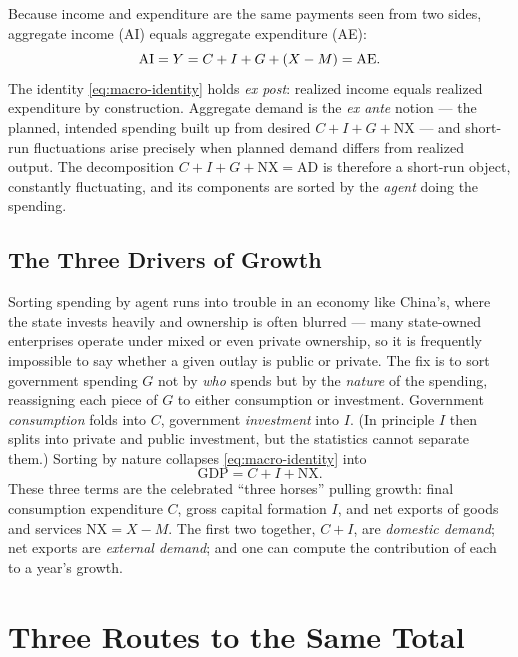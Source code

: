 Because income and expenditure are the same payments seen from two sides, aggregate income (AI) equals aggregate expenditure (AE):
\begin{equation}
\mathrm{AI} = Y = C + I + G + \left(X - M\right) = \mathrm{AE}.
\label{eq:macro-identity}
\end{equation}
The identity \eqref{eq:macro-identity} holds \emph{ex post}: realized income equals realized expenditure by construction. Aggregate demand is the \emph{ex ante} notion --- the planned, intended spending built up from desired $C + I + G + \mathrm{NX}$ --- and short-run fluctuations arise precisely when planned demand differs from realized output. The decomposition $C + I + G + \mathrm{NX} = \mathrm{AD}$ is therefore a short-run object, constantly fluctuating, and its components are sorted by the \emph{agent} doing the spending.

\subsection{The Three Drivers of Growth}

Sorting spending by agent runs into trouble in an economy like China's, where the state invests heavily and ownership is often blurred --- many state-owned enterprises operate under mixed or even private ownership, so it is frequently impossible to say whether a given outlay is public or private. The fix is to sort government spending $G$ not by \emph{who} spends but by the \emph{nature} of the spending, reassigning each piece of $G$ to either consumption or investment. Government \emph{consumption} folds into $C$, government \emph{investment} into $I$. (In principle $I$ then splits into private and public investment, but the statistics cannot separate them.) Sorting by nature collapses \eqref{eq:macro-identity} into
\begin{equation}
\mathrm{GDP} = C + I + \mathrm{NX}.
\label{eq:macro-three-drivers}
\end{equation}
These three terms are the celebrated ``three horses'' pulling growth: final consumption expenditure $C$, gross capital formation $I$, and net exports of goods and services $\mathrm{NX} = X - M$. The first two together, $C + I$, are \emph{domestic demand}; net exports are \emph{external demand}; and one can compute the contribution of each to a year's growth.

\section{Three Routes to the Same Total}

